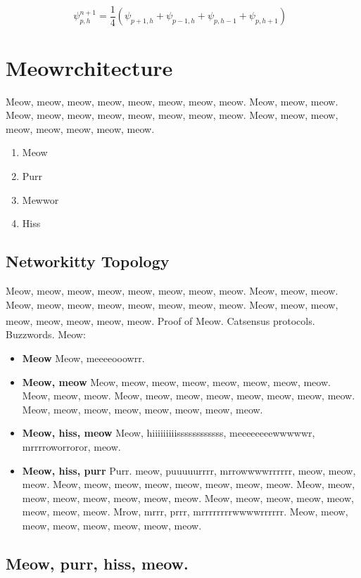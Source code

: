 \documentclass[9pt,oneside]{amsart}
\newcommand*\lipsumeow{Meow, meow, meow, meow, meow, meow, meow, meow.  Meow, meow, meow. Meow, meow, meow, meow, meow, meow, meow, meow. Meow, meow, meow, meow, meow, meow, meow, meow. }
\newcommand*\lipsumeowpurr{Purr. meow, puuuuurrrr, mrrowwwwrrrrrr, meow, meow, meow. Meow, meow, meow, meow, meow, meow, meow, meow. Meow, meow, meow, meow, meow, meow, meow, meow. Meow, meow, meow, meow, meow, meow, meow, meow. Mrow, mrrr, prrr, mrrrrrrrrwwwwrrrrrr. Meow, meow, meow, meow, meow, meow, meow, meow.}
\newcommand*\lipsumhiss{Meow, hiiiiiiiiissssssssssss, meeeeeeeewwwwwr, mrrrroworroror, meow.}
\begin{document}
\begin{multicols}{2}
\begin{equation}
\psi_{p,h}^{n+1}=\frac{1}{4}\left( \psi_{p+1,h}+\psi_{p-1,h}+\psi_{p,h-1}+\psi_{p,h+1}\right)\;\;
\label{subsec:mrwhiskers}
\end{equation}

\section{Meowrchitecture}\label{sec:architecture}
 
 \lipsumeow{}
 
\begin{enumerate}
  \item Meow 
  \item Purr
  \item Mewwor
  \item Hiss
\end{enumerate}

\subsection{Networkitty Topology}\label{subsec:network_topology}

 \lipsumeow{} Proof of Meow.\textsuperscript{\textregistered} Catsensus protocols. Buzzwords. Meow:
 
\begin{itemize}
 \item \textbf{Meow}  Meow, meeeeooowrr.
 \item  \textbf{Meow, meow} \lipsumeow{}
 \item  \textbf{Meow, hiss, meow} \lipsumhiss{}
 \item  \textbf{Meow, hiss, purr} \lipsumeowpurr{}
\end{itemize}
 
\subsection{Meow, purr, hiss, meow.}\label{subsec:decentral_security_scalable}


\end{multicols}
\end{document}
